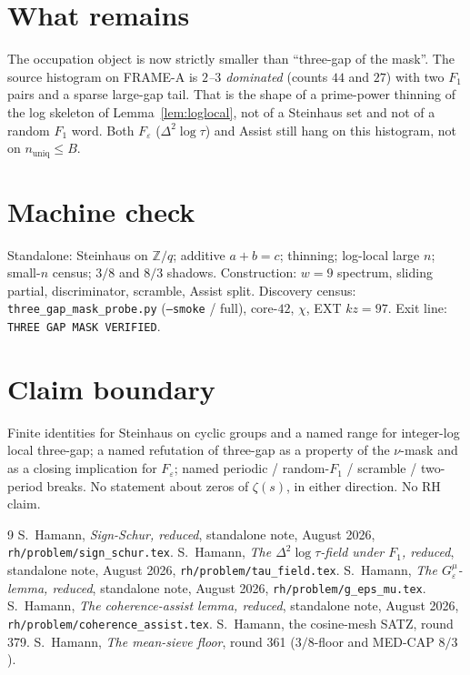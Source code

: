 \documentclass[11pt]{article}
\theoremstyle{remark}
\newcommand{\Z}{\mathbb{Z}}
\begin{document}
\section{What remains}\label{sec:rest}

The occupation object is now strictly smaller than
``three-gap of the mask''.  The source histogram on FRAME-A is
\emph{$2$--$3$ dominated} (counts $44$ and $27$) with two
$F_1$ pairs and a sparse large-gap tail.  That is the shape of
a prime-power thinning of the log skeleton of
Lemma~\ref{lem:loglocal}, not of a Steinhaus set and not of a
random $F_1$ word.  Both $F_\varepsilon$ ($\Delta^2\log\tau$)
and Assist still hang on this histogram, not on
$n_{\mathrm{uniq}}\le B$.

\section*{Machine check}

Standalone: Steinhaus on $\Z/q$; additive $a+b=c$; thinning;
log-local large $n$; small-$n$ census; $3/8$ and $8/3$ shadows.
Construction: $w=9$ spectrum, sliding partial, discriminator,
scramble, Assist split.
Discovery census: \texttt{three\_gap\_mask\_probe.py}
(\texttt{--smoke} / full), core-$42$, $\chi$, EXT $kz=97$.
Exit line: \texttt{THREE GAP MASK VERIFIED}.

\section*{Claim boundary}

Finite identities for Steinhaus on cyclic groups and a named
range for integer-log local three-gap; a named refutation of
three-gap as a property of the $\nu$-mask and as a closing
implication for $F_\varepsilon$; named periodic / random-$F_1$
/ scramble / two-period breaks.
No statement about zeros of $\zeta(s)$, in either direction.
No RH claim.

\begin{thebibliography}{9}
S.~Hamann,
\textit{Sign-Schur, reduced},
standalone note, August 2026,
\texttt{rh/problem/sign\_schur.tex}.
S.~Hamann,
\textit{The $\Delta^2\log\tau$-field under $F_1$, reduced},
standalone note, August 2026,
\texttt{rh/problem/tau\_field.tex}.
S.~Hamann,
\textit{The $G_\varepsilon^\mu$-lemma, reduced},
standalone note, August 2026,
\texttt{rh/problem/g\_eps\_mu.tex}.
S.~Hamann,
\textit{The coherence-assist lemma, reduced},
standalone note, August 2026,
\texttt{rh/problem/coherence\_assist.tex}.
S.~Hamann,
the cosine-mesh SATZ, round 379.
S.~Hamann,
\textit{The mean-sieve floor},
round 361 ($3/8$-floor and MED-CAP $8/3$).
\end{thebibliography}
\end{document}
